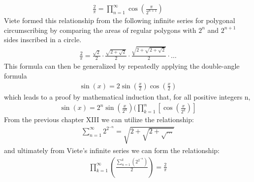 \documentclass{article}
\begin{document}
\begin{align*}
\frac{2}{\pi} = \prod_{n=1}^{\infty} \cos\left(\frac{\pi}{2^{n+1}}\right)
\end{align*}
Viete formed this relationship from the following infinite series for polygonal circumscribing by comparing the areas of regular polygons with $2^{n}$ and $2^{n+1}$ sides inscribed in a circle.
\begin{align*}
\frac{2}{\pi} = \frac{\sqrt{2}}{2} \cdot \frac{\sqrt{2+\sqrt{2}}}{2} \cdot \frac{\sqrt{2+\sqrt{2+\sqrt{2}}}}{2} \cdot \ldots
\end{align*}
This formula can then be generalized by repeatedly applying the double-angle formula
\begin{align*}
\sin(x) = 2\sin(\frac{x}{2})\cos(\frac{x}{2})
\end{align*}
which leads to a proof by mathematical induction that, for all positive integers n,
\begin{align*}
\sin(x) = 2^{n}\sin(\frac{x}{2^{n}})(\prod_{k=1}^{n} [\cos(\frac{x}{2^{k}})]
\end{align*}
From the previous chapter XIII we can utilize the relationship:
\begin{align*}
\sum_{n=1}^{\infty} 2^{2^{-n}} = \sqrt{2 + \sqrt{2 + \sqrt{\ldots}}}
\end{align*}
and ultimately from Viete's infinite series we can form the relationship:
\begin{align*}
\prod_{k=1}^{\infty} (\frac{\sum_{n=1}^{k} (2^{2^{-n}})}{2}) = \frac{2}{\pi}
\end{align*}
\end{document}
